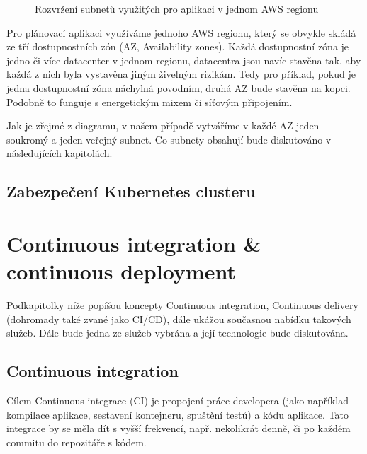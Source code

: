 \documentclass[thesis=M,czech]{FITthesis}[2019/12/23]
\theoremstyle{plain}
\theoremstyle{definition}
\begin{document}
\begin{figure}[H]\centering
	

	\caption[Rozvržení subnetů využitých pro aplikaci v jednom AWS regionu]{Rozvržení subnetů využitých pro aplikaci v jednom AWS regionu}\label{fig:float}
\end{figure}

Pro plánovací aplikaci využíváme jednoho AWS regionu, který se obvykle skládá ze tří dostupnostních zón (AZ, Availability zones)\cite{aws-azs}. Každá dostupnostní zóna je jedno či více datacenter v jednom regionu, datacentra jsou navíc stavěna tak, aby každá z nich byla vystavěna jiným živelným rizikám. Tedy pro příklad, pokud je jedna dostupnostní zóna náchylná povodním, druhá AZ bude stavěna na kopci. Podobně to funguje s energetickým mixem či síťovým připojením. 


Jak je zřejmé z diagramu, v našem případě vytváříme v každé AZ jeden soukromý a jeden veřejný subnet. Co subnety obsahují bude diskutováno v následujících kapitolách.

\subsection{Zabezpečení Kubernetes clusteru}



\section{Continuous integration \& continuous deployment}

Podkapitolky níže popíšou koncepty Continuous integration, Continuous delivery (dohromady také zvané jako CI/CD), dále ukážou současnou nabídku takových služeb. Dále bude jedna ze služeb vybrána a její technologie bude diskutována.

\subsection{Continuous integration}

Cílem Continuous integrace (CI) \cite{fowler-ci}je propojení práce developera (jako například kompilace aplikace, sestavení kontejneru, spuštění testů) a kódu aplikace. Tato integrace by se měla dít s vyšší frekvencí, např. nekolikrát denně, či po každém commitu do repozitáře s kódem.
\end{document}
